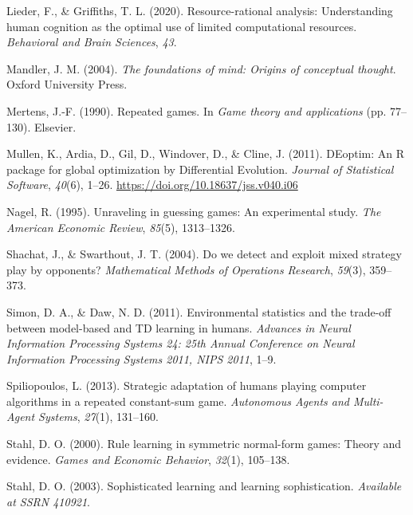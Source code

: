 \documentclass[man,floatsintext]{apa6}
\begin{document}
\leavevmode\hypertarget{ref-lieder2020resource}{}%
Lieder, F., \& Griffiths, T. L. (2020). Resource-rational analysis: Understanding human cognition as the optimal use of limited computational resources. \emph{Behavioral and Brain Sciences}, \emph{43}.

\leavevmode\hypertarget{ref-mandler2004foundations}{}%
Mandler, J. M. (2004). \emph{The foundations of mind: Origins of conceptual thought}. Oxford University Press.

\leavevmode\hypertarget{ref-mertens1990repeated}{}%
Mertens, J.-F. (1990). Repeated games. In \emph{Game theory and applications} (pp. 77--130). Elsevier.

\leavevmode\hypertarget{ref-R-DEoptim}{}%
Mullen, K., Ardia, D., Gil, D., Windover, D., \& Cline, J. (2011). DEoptim: An R package for global optimization by Differential Evolution. \emph{Journal of Statistical Software}, \emph{40}(6), 1--26. \url{https://doi.org/10.18637/jss.v040.i06}

\leavevmode\hypertarget{ref-nagel1995unraveling}{}%
Nagel, R. (1995). Unraveling in guessing games: An experimental study. \emph{The American Economic Review}, \emph{85}(5), 1313--1326.

\leavevmode\hypertarget{ref-shachat2004we}{}%
Shachat, J., \& Swarthout, J. T. (2004). Do we detect and exploit mixed strategy play by opponents? \emph{Mathematical Methods of Operations Research}, \emph{59}(3), 359--373.

\leavevmode\hypertarget{ref-Simon_Daw_11}{}%
Simon, D. A., \& Daw, N. D. (2011). Environmental statistics and the trade-off between model-based and TD learning in humans. \emph{Advances in Neural Information Processing Systems 24: 25th Annual Conference on Neural Information Processing Systems 2011, NIPS 2011}, 1--9.

\leavevmode\hypertarget{ref-spiliopoulos2013strategic}{}%
Spiliopoulos, L. (2013). Strategic adaptation of humans playing computer algorithms in a repeated constant-sum game. \emph{Autonomous Agents and Multi-Agent Systems}, \emph{27}(1), 131--160.

\leavevmode\hypertarget{ref-stahl2000rule}{}%
Stahl, D. O. (2000). Rule learning in symmetric normal-form games: Theory and evidence. \emph{Games and Economic Behavior}, \emph{32}(1), 105--138.

\leavevmode\hypertarget{ref-stahl2003sophisticated}{}%
Stahl, D. O. (2003). Sophisticated learning and learning sophistication. \emph{Available at SSRN 410921}.
\end{document}
